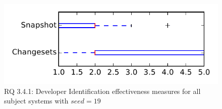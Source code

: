 
\begin{figure}
\centering
\includegraphics[height=0.4\textheight]{figures/dit_seed/rq1_tiny_19}
\caption{RQ 3.4.1: Developer Identification effectiveness measures for all subject systems with $seed=19$}
\label{fig:dit_seed:rq1:tiny}
\end{figure}
